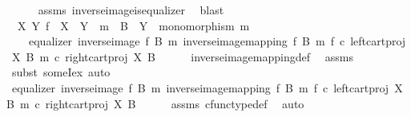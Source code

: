 \begin{isabellebody}
\ \ \ \ \isamarkupfalse%
\ assms\ inverse{\isacharunderscore}{\kern0pt}image{\isacharunderscore}{\kern0pt}is{\isacharunderscore}{\kern0pt}equalizer\ \isamarkupfalse%
\ blast\isanewline
\ \ \isamarkupfalse%
\ \isamarkupfalse%
\ {\isachardoublequoteopen}{\isasymexists}\ X\ Y{\isachardot}{\kern0pt}\ f\ {\isacharcolon}{\kern0pt}\ X\ {\isasymrightarrow}\ Y\ {\isasymand}\ m\ {\isacharcolon}{\kern0pt}\ B\ {\isasymrightarrow}\ Y\ {\isasymand}\ monomorphism\ m\ {\isasymand}\isanewline
\ \ \ \ equalizer\ {\isacharparenleft}{\kern0pt}inverse{\isacharunderscore}{\kern0pt}image\ f\ B\ m{\isacharparenright}{\kern0pt}\ {\isacharparenleft}{\kern0pt}inverse{\isacharunderscore}{\kern0pt}image{\isacharunderscore}{\kern0pt}mapping\ f\ B\ m{\isacharparenright}{\kern0pt}\ {\isacharparenleft}{\kern0pt}f\ {\isasymcirc}\isactrlsub c\ left{\isacharunderscore}{\kern0pt}cart{\isacharunderscore}{\kern0pt}proj\ X\ B{\isacharparenright}{\kern0pt}\ {\isacharparenleft}{\kern0pt}m\ {\isasymcirc}\isactrlsub c\ right{\isacharunderscore}{\kern0pt}cart{\isacharunderscore}{\kern0pt}proj\ X\ B{\isacharparenright}{\kern0pt}{\isachardoublequoteclose}\isanewline
\ \ \ \ \isamarkupfalse%
\ inverse{\isacharunderscore}{\kern0pt}image{\isacharunderscore}{\kern0pt}mapping{\isacharunderscore}{\kern0pt}def\ \isamarkupfalse%
\ assms\ \isamarkupfalse%
\ {\isacharparenleft}{\kern0pt}subst\ someI{\isacharunderscore}{\kern0pt}ex{\isacharcomma}{\kern0pt}\ auto{\isacharparenright}{\kern0pt}\isanewline
\ \ \isamarkupfalse%
\ \isamarkupfalse%
\ {\isachardoublequoteopen}equalizer\ {\isacharparenleft}{\kern0pt}inverse{\isacharunderscore}{\kern0pt}image\ f\ B\ m{\isacharparenright}{\kern0pt}\ {\isacharparenleft}{\kern0pt}inverse{\isacharunderscore}{\kern0pt}image{\isacharunderscore}{\kern0pt}mapping\ f\ B\ m{\isacharparenright}{\kern0pt}\ {\isacharparenleft}{\kern0pt}f\ {\isasymcirc}\isactrlsub c\ left{\isacharunderscore}{\kern0pt}cart{\isacharunderscore}{\kern0pt}proj\ X\ B{\isacharparenright}{\kern0pt}\ {\isacharparenleft}{\kern0pt}m\ {\isasymcirc}\isactrlsub c\ right{\isacharunderscore}{\kern0pt}cart{\isacharunderscore}{\kern0pt}proj\ X\ B{\isacharparenright}{\kern0pt}{\isachardoublequoteclose}\isanewline
\ \ \ \ \isamarkupfalse%
\ assms{\isacharparenleft}{\kern0pt}{}{\isacharparenright}{\kern0pt}\ cfunc{\isacharunderscore}{\kern0pt}type{\isacharunderscore}{\kern0pt}def\ \isamarkupfalse%
\ auto\isanewline
{}\isamarkupfalse%

\end{isabellebody}
